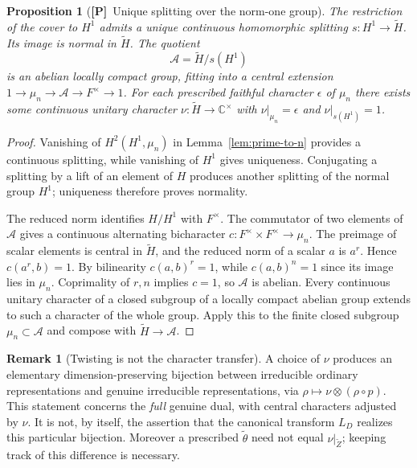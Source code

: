 \documentclass[11pt]{article}
\newcommand{\tH}{\widetilde H}
\newcommand{\tZ}{\widetilde Z}
\newcommand{\Ptag}{\textnormal{\textbf{[P]}}}
\theoremstyle{plain}
\newtheorem{proposition}[theorem]{Proposition}
\theoremstyle{definition}
\newtheorem{remark}[theorem]{Remark}
\begin{document}
\begin{proposition}[\Ptag\ Unique splitting over the norm-one group]\label{prop:tame-split}
The restriction of the cover to $H^1$ admits a unique continuous
homomorphic splitting $s:H^1\to\tH$. Its image is normal in $\tH$.
The quotient
\[
\mathcal A=\tH/s(H^1)
\]
is an abelian locally compact group, fitting into a central extension
$1\to\mu_n\to\mathcal A\to F^\times\to1$.
For each prescribed faithful character $\epsilon$ of $\mu_n$ there exists
\emph{some} continuous unitary character $\nu:\tH\to\mathbb C^\times$
with $\nu|_{\mu_n}=\epsilon$ and $\nu|_{s(H^1)}=1$.
\end{proposition}
\begin{proof}
Vanishing of $H^2(H^1,\mu_n)$ in Lemma~\ref{lem:prime-to-n}
provides a continuous splitting, while vanishing of $H^1$
gives uniqueness. Conjugating a splitting by a lift of an element
of $H$ produces another splitting of the normal group $H^1$;
uniqueness therefore proves normality.

The reduced norm identifies $H/H^1$ with $F^\times$.
The commutator of two elements of $\mathcal A$ gives a continuous
alternating bicharacter
$c:F^\times\times F^\times\to\mu_n$.
The preimage of scalar elements is central in $\tH$, and the
reduced norm of a scalar $a$ is $a^r$. Hence $c(a^r,b)=1$.
By bilinearity $c(a,b)^r=1$, while $c(a,b)^n=1$ since its image
lies in $\mu_n$. Coprimality of $r,n$ implies $c=1$, so
$\mathcal A$ is abelian. Every continuous unitary character of a
closed subgroup of a locally compact abelian group extends to
such a character of the whole group. Apply this to the finite
closed subgroup $\mu_n\subset\mathcal A$ and compose with
$\tH\to\mathcal A$.
\end{proof}

\begin{remark}[Twisting is not the character transfer]\label{rem:tame-twist}
A choice of $\nu$ produces an elementary dimension-preserving
bijection between irreducible ordinary representations and genuine
irreducible representations, via
$\rho\mapsto\nu\otimes(\rho\circ p)$.
This statement concerns the \emph{full} genuine dual, with central
characters adjusted by $\nu$. It is not, by itself, the assertion
that the canonical transform $L_D$ realizes this particular bijection.
Moreover a prescribed $\widetilde\theta$ need not equal
$\nu|_{\tZ}$; keeping track of this difference is necessary.
\end{remark}
\end{document}
